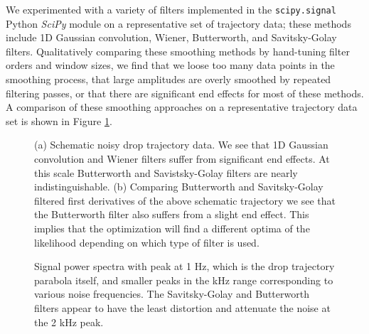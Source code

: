 \documentclass[12pt,a4paper,oneside]{book}
\begin{document}
We experimented with a variety of filters implemented in the \verb|scipy.signal| Python \emph{SciPy} \cite{oliphant_python_2007} module on a representative set of trajectory data; these methods include 1D Gaussian convolution, Wiener, Butterworth, and Savitsky-Golay filters. Qualitatively comparing these smoothing methods by hand-tuning filter orders and window sizes, we find that we loose too many data points in the smoothing process, that large amplitudes are overly smoothed by repeated filtering passes, or that there are significant end effects for most of these methods. A comparison of these smoothing approaches on a representative trajectory data set is shown in Figure \ref{fig:y_filtered}.
\begin{figure}[htp]
    \centering
    \subfloat[]{%
}


     \subfloat[]{%
}
       \caption{(a) Schematic noisy drop trajectory data. We see that 1D Gaussian convolution and Wiener filters suffer from significant end effects. At this scale Butterworth and Savistsky-Golay filters are nearly indistinguishable. (b) Comparing Butterworth and Savitsky-Golay filtered first derivatives of the above schematic trajectory we see that the Butterworth filter also suffers from a slight end effect. This implies that the optimization will find a different optima of the likelihood depending on which type of filter is used.}
      \label{fig:y_filtered}
\end{figure}
%    
\begin{figure}
    \centering
    
    \caption{Signal power spectra with peak at 1 Hz, which is the drop trajectory parabola itself, and smaller peaks in the kHz range corresponding to various noise frequencies. The Savitsky-Golay and Butterworth filters appear to have the least distortion and attenuate the noise at the 2 kHz peak. \label{fig:power}}
\end{figure}
\end{document}
